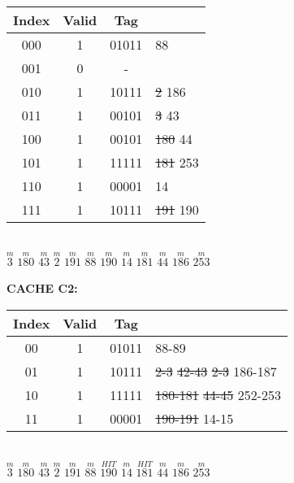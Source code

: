 \documentclass[12pt]{article}
\begin{document}
	\begin{center}
		\begin{tabular}{ |c|c|c|l| } 
			\hline
			Index & Valid & Tag &  \\
			\hline
			000 & 1 & 01011 & 88\\
			\hline
			001 & 0 & - & \\
			\hline
			010 & 1 & 10111 & \sout{2} 186 \\
			\hline
			011 & 1 & 00101 & \sout{3} 43 \\
			\hline
			100 & 1 & 00101 & \sout{180} 44 \\
			\hline
			101 & 1 & 11111 & \sout{181} 253 \\
			\hline
			110 & 1 & 00001 & 14 \\
			\hline
			111 & 1 & 10111 & \sout{191} 190 \\
			\hline
			
		\end{tabular}
		\\
		$\overset{m}{3}$ $\overset{m}{180}$ $\overset{m}{43}$ $\overset{m}{2}$ $\overset{m}{191}$ $\overset{m}{88}$ $\overset{m}{190}$ $\overset{m}{14}$ $\overset{m}{181}$ $\overset{m}{44}$ $\overset{m}{186}$ $\overset{m}{253}$  \vspace{0.5cm} \\
	\end{center}
	
	\noindent \textbf{CACHE C2:}  \\
	
	\begin{center}
		\begin{tabular}{ |c|c|c|l| } 
			\hline
			Index & Valid & Tag &  \\
			\hline
			00 & 1 & 01011 & 88-89\\
			\hline
			01 & 1 & 10111 & \sout{2-3} \sout{42-43} \sout{2-3} 186-187 \\
			\hline
			10 & 1 & 11111 & \sout{180-181} \sout{44-45} 252-253\\
			\hline
			11 & 1 & 00001 & \sout{190-191} 14-15\\
			\hline
			
		\end{tabular}
		\\
		$\overset{m}{3}$ $\overset{m}{180}$ $\overset{m}{43}$ $\overset{m}{2}$ $\overset{m}{191}$ $\overset{m}{88}$ $\overset{HIT}{190}$ $\overset{m}{14}$ $\overset{HIT}{181}$ $\overset{m}{44}$ $\overset{m}{186}$ $\overset{m}{253}$  \vspace{0.5cm} \\
	\end{center}
	
\end{document}
